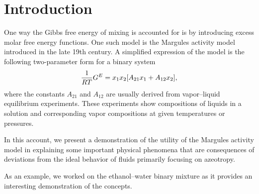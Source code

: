 \section{Introduction}



One way the Gibbs free energy of mixing is accounted for is by introducing
excess molar free energy functions. One such model is the Margules activity model
introduced in the late 19th century. A simplified expression of the model
is the following two-parameter form for a binary system \cite[pp.~430]{enggbook}
\begin{equation}\label{eq:margules-two-param}
    \dfrac1{RT} G^E = x_1x_2 \qty[A_{21}x_1 + A_{12}x_2],
\end{equation}
where the constants $A_{21}$ and $A_{12}$ are usually derived from vapor--liquid
equilibrium experiments. These experiments show compositions of liquids in a
solution and corresponding vapor compositions at given temperatures or pressures.

In this account, we present a demonstration of the utility of the Margules
activity model in explaining some important physical phenomena that are
consequences of deviations from the ideal behavior of fluids primarily
focusing on azeotropy.

As an example, we worked on the ethanol--water binary mixture as it provides
an interesting demonstration of the concepts.

